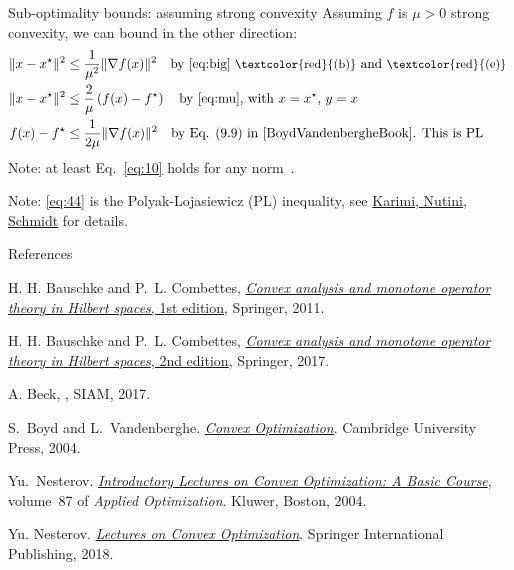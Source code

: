 \documentclass[10pt,handout]{beamer}
\begin{document}
\begin{frame}{Sub-optimality bounds: assuming strong convexity}
Assuming $f$ is $\mu>0$ strong convexity, we can bound in the other direction:
\begin{align}
    \|x-x^\star\|^2 &\le \frac{1}{\mu^2}\|\nabla f(x)\|^2 
    \quad \text{by \eqref{eq:big}  {\small\textcolor{red}{(b)}} and  {\small\textcolor{red}{(e)}} }
    \\
    \|x-x^\star\|^2 &\le \frac{2}{\mu}\left( f(x) - f^\star\right)
    \quad \text{by \eqref{eq:mu}, with $x=x^\star$, $y=x$} \label{eq:10} \\
    f(x) - f^\star &\le \frac{1}{2\mu}\|\nabla f(x)\|^2 \quad\text{by Eq. (9.9) in \cite{BoydVandenbergheBook}. This is PL}
    \label{eq:44}
\end{align}
Note: at least Eq.~\eqref{eq:10} holds for any norm~\cite[Thm. 5.25]{BeckBook}.

 Note: \eqref{eq:44} is the Polyak-Lojasiewicz (PL) inequality, see \href{https://arxiv.org/abs/1608.04636}{Karimi, Nutini, Schmidt} for details. 
 
 

\end{frame}


\begin{frame}{References}
\begin{thebibliography}{AZQRY16}
    
    H. H. Bauschke and P.~L. Combettes, \href{https://link.springer.com/book/10.1007/978-1-4419-9467-7}{\emph{Convex analysis and monotone
            operator theory in {H}ilbert spaces}, 1st edition}, {S}pringer, 2011.
    
    H. H. Bauschke and P.~L. Combettes, \href{https://link.springer.com/book/10.1007/978-3-319-48311-5}{\emph{Convex analysis and monotone
            operator theory in {H}ilbert spaces}, 2nd edition}, {S}pringer, 2017.
    
    A. Beck, \href{First-Order Methods in Optimization}, SIAM, 2017.
    
    S.~Boyd and L.~Vandenberghe.
    \newblock \href{http://www.stanford.edu/~boyd/cvxbook/}{{\em Convex Optimization}}.
    \newblock Cambridge University Press, 2004.
    
    Yu.~Nesterov.
    \newblock \href{https://link.springer.com/book/10.1007/978-1-4419-8853-9}{{\em Introductory Lectures on Convex Optimization: A Basic Course}},
    volume~87 of {\em Applied Optimization}.
    \newblock Kluwer, Boston, 2004.
    
    Yu. Nesterov.
    \newblock \href{https://link.springer.com/book/10.1007/978-3-319-91578-4}{{\em Lectures on Convex Optimization}}.
    \newblock Springer International Publishing, 2018.
    
\end{thebibliography}
    
\end{frame}
\end{document}
